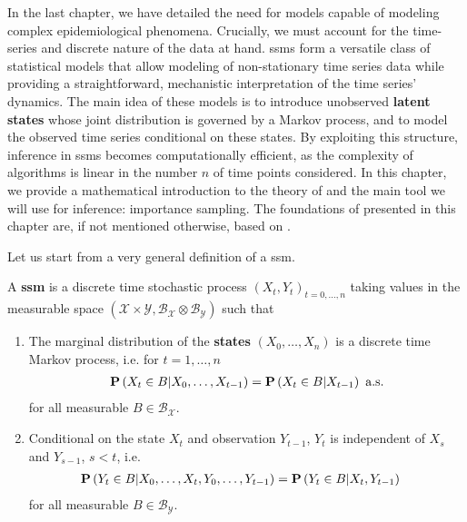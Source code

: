 In the last chapter, we have detailed the need for models capable of modeling complex epidemiological phenomena. Crucially, we must account for the time-series and discrete nature of the data at hand. 
\Glspl{ssm} form a versatile class of statistical models that allow modeling of non-stationary time series data while providing a straightforward, mechanistic interpretation of the time series' dynamics.
The main idea of these models is to introduce unobserved \textbf{latent states} whose joint distribution is governed by a Markov process, and to model the observed time series conditional on these states.
By exploiting this structure, inference in \glspl{ssm} becomes computationally efficient, as the complexity of algorithms is linear in the number $n$ of time points considered. 
In this chapter, we provide a mathematical introduction to the theory of  and the main tool we will use for inference: importance sampling. 
The foundations of  presented in this chapter are, if not mentioned otherwise, based on \citep{Durbin2012Time,Chopin2020Introduction}.

Let us start from a very general definition of a \acrshort{ssm}.

\begin{definition}
    \label{def:ssm}
    A \textbf{\acrlong{ssm}} is a discrete time stochastic process $(X_t, Y_t)_{t=0, \dots, n}$ taking values in the measurable space $\left(\mathcal X \times \mathcal Y, \mathcal B_{\mathcal X} \otimes \mathcal B_{\mathcal Y}\right)$ such that
    \begin{enumerate}
        \item The marginal distribution of the \textbf{states} $(X_0, \dots, X_{n})$ is a discrete time Markov process, i.e. for $t = 1, \dots, n$
              \begin{align}
                  \label{eq:markov_property}
                  \P \left( X_{t} \in B \middle| X_0, \dots, X_{t - 1} \right) = \P \left( X_{t} \in B \middle| X_{t - 1} \right) \text{ a.s.}
              \end{align}
              for all measurable $B \in \mathcal B_{\mathcal X}$.
        \item Conditional on the state $X_t$ and observation $Y_{t - 1}$, $Y_t$ is independent of $X_s$ and $Y_{s - 1}$, $s < t$, i.e.
              \begin{align*}
                  \P \left( Y_{t} \in B \middle| X_{0}, \dots, X_{t}, Y_{0}, \dots, Y_{t - 1} \right) & = \P \left( Y_{t} \in B | X_{t}, Y_{t - 1} \right)
              \end{align*}
              for all measurable $B \in \mathcal B _{\mathcal Y}$.
    \end{enumerate}
\end{definition}

